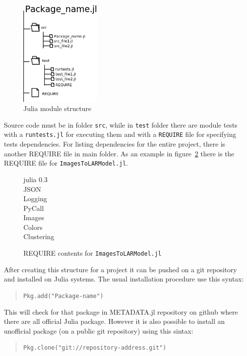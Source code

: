 \documentclass[11pt,oneside]{article}	%
\begin{document}
\begin{figure}[htb]
  \begin{center}
    \includegraphics[width=4cm]{images/module-files.png}
  \end{center}
  \caption{Julia module structure}
  \label{fig:julia-module}
\end{figure}

Source code must be in folder \texttt{src}, while in \texttt{test} folder there are module tests with a \texttt{runtests.jl} for executing them and with a \texttt{REQUIRE} file for specifying tests dependencies. For listing dependencies for the entire project, there is another REQUIRE file in main folder. As an example in figure~\ref{fig:require-example} there is the REQUIRE file for \texttt{ImagesToLARModel.jl}.

\begin{figure}[htb]
  \begin{center}
    julia 0.3\\
    JSON\\
    Logging\\
    PyCall\\
    Images\\
    Colors\\
    Clustering
  \end{center}
  \caption{REQUIRE contents for \texttt{ImagesToLARModel.jl}}
  \label{fig:require-example}
\end{figure}

After creating this structure for a project it can be pushed on a git repository and installed on Julia systems. The usual installation procedure use this syntax:
\begin{quote}
 \texttt{Pkg.add("Package-name")}
\end{quote}

This will check for that package in METADATA.jl repository on github where there are all official Julia package. However it is also possible to install an unofficial package (on a public git repository) using this sintax:
\begin{quote}
 \texttt{Pkg.clone("git://repository-address.git")}
\end{quote}
\end{document}
